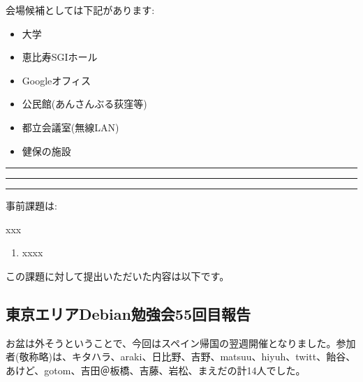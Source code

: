 \documentclass[mingoth,a4paper]{jsarticle}
\begin{document}
\begin{multicols}{2}
 会場候補としては下記があります:

 \begin{itemize}
  \item 大学
  \item 恵比寿SGIホール
  \item Googleオフィス
  \item 公民館(あんさんぶる荻窪等)
  \item 都立会議室(無線LAN)
  \item 健保の施設
 \end{itemize}

\end{multicols}


\newpage

\begin{minipage}[b]{0.2\hsize}
 \colorbox{titleback}{}
\end{minipage}
\begin{minipage}[b]{0.8\hsize}
\hrule
\vspace{2mm}
\hrule

\setcounter{tocdepth}{1}
\tableofcontents
\vspace{2mm}
\hrule
\end{minipage}



事前課題は:

xxx

\begin{enumerate}
 \item xxxx
\end{enumerate}

この課題に対して提出いただいた内容は以下です。

\begin{multicols}{2}
%
\end{multicols}

%
%

\subsection{東京エリアDebian勉強会55回目報告}

お盆は外そうということで、今回はスペイン帰国の翌週開催となりました。参加者(敬称略)は、キタハラ、araki、日比野、吉野、matsuu、hiyuh、twitt、飴谷、あけど、gotom、吉田＠板橋、吉藤、岩松、まえだの計14人でした。
\end{document}
